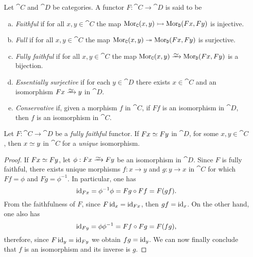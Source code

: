 \begin{definition}
\label{def:faithful-full-fully-faithful-essentially-surjective-conservative}
Let \(\cat C\) and \(\cat D\) be categories. A functor \(F: \cat C \to \cat D\)
is said to be
\begin{enumerate}[(a)]\setlength\itemsep{0em}
\item \emph{Faithful} if for all \(x, y \in \cat C\) the map \(\operatorname{Mor}_{\texttt C}(x,
  y) \rightarrowtail \operatorname{Mor}_{\texttt D}(F x, F y)\) is injective.
\item \emph{Full} if for all \(x, y \in \cat C\) the map \(\operatorname{Mor}_{\texttt C}(x, y)
  \twoheadrightarrow \operatorname{Mor}_{\texttt D}(F x, F y)\) is surjective.
\item \emph{Fully faithful} if for all \(x, y \in \cat C\) the map \(\Hom_{\cat
    C}(x, y) \isoto \Hom_{\cat D}(F x, F y)\) is a bijection.
\item \emph{Essentially surjective} if for each \(y \in \cat D\) there exists
  \(x \in \cat C\) and an isomorphism \(F x \isoto y\) in \(\cat D\).
\item \emph{Conservative} if, given a morphism \(f\) in \(\cat C\), if \(F f\)
  is an isomorphism in \(\cat D\), then \(f\) is an isomorphism in \(\cat C\).
\end{enumerate}
\end{definition}

\begin{proposition}
\label{prop:fully-faithful-image-iso-then-obj-iso}
Let \(F: \cat C \to \cat D\) be a \emph{fully faithful} functor. If
\(F x \simeq F y\) in \(\cat D\), for some \(x, y \in \cat C\), then \(x \simeq y\)
in \(\cat C\) for a \emph{unique} isomorphism.
\end{proposition}

\begin{proof}
If \(F x \simeq F y\), let \(\phi: F x \isoto F y\) be an isomorphism in
\(\cat D\). Since \(F\) is fully faithful, there exists unique morphisms
\(f: x \to y\) and \(g: y \to x\) in \(\cat C\) for which \(F f = \phi\) and
\(F g = \phi^{-1}\). In particular, one has
\[
\operatorname{id}_{F x} =  \phi^{-1} \phi = F g \circ F f = F(g f).
\]
From the faithfulness of \(F\), since \(F \operatorname{id}_x = \operatorname{id}_{F x}\), then
\(g f = \operatorname{id}_x\). On the other hand, one also has
\[
\operatorname{id}_{F y} = \phi \phi^{-1} = F f \circ F g = F(f g),
\]
therefore, since \(F \operatorname{id}_y = \operatorname{id}_{F y}\) we obtain \(f g = \operatorname{id}_y\). We can now
finally conclude that \(f\) is an isomorphism and its inverse is \(g\).
\end{proof}

